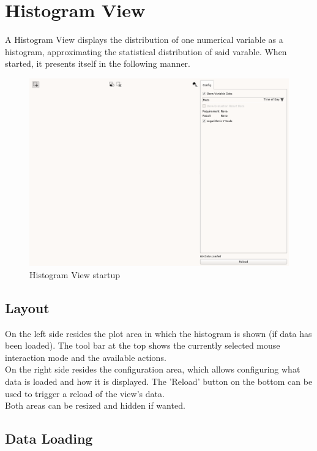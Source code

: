 \chapter{Histogram View}
\label{sec:histo_view}

A Histogram View displays the distribution of one numerical variable as a histogram, approximating the statistical distribution of said varable. When started, it presents itself in the following manner.

\begin{figure}[H]
    \hspace*{-2cm}
    \includegraphics[width=18cm,frame]{figures/histogram_start.png}
  \caption{Histogram View startup}
\end{figure}

\section{Layout}

On the left side resides the plot area in which the histogram is shown (if data has been loaded). 
The tool bar at the top shows the currently selected mouse interaction mode and the available actions.\\

On the right side resides the configuration area, which allows configuring what data is loaded and how it is displayed.
The 'Reload' button on the bottom can be used to trigger a reload of the view's data.\\

Both areas can be resized and hidden if wanted.

\section{Data Loading}

